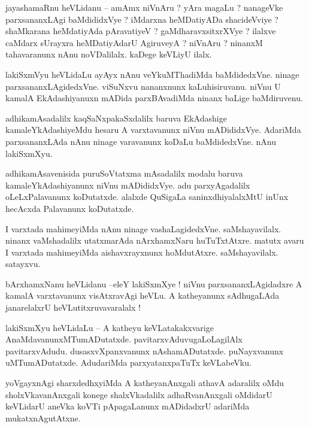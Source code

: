 \documentclass{article}
\begin{document}
\begin{mn}%
jayashamaRnu heVLidanu -- amAmx niVnAru ? yAra magaLu ? nanageVke parxsananxLAgi baMdididxVye ? 
iMdarxna heMDatiyADa shacideVviye ? shaMkarana heMdatiyAda pAravatiyeV ? gaMdharavxsitxrXVye ? 
ilalxve caMdarx sUrayxra heMDatiyAdarU AgiruveyA ? niVnAru ? ninanxM tahavaranunx nAnu 
noVDalilalx. kaDege keVLiyU ilalx.
\end{mn}

\begin{mn}%
lakiSxmVyu heVLidaLu ayAyx nAnu veYkuMThadiMda baMdidedxVne. ninage parxsananxLAgidedxVne. viSuNxvu 
nananxnunx kaLuhisiruvanu. niVnu U kamalA EkAdashiyanuxn mADida parxBAvadiMda ninanx baLige 
baMdiruvenu.
\end{mn}

\begin{mn}%
adhikamAsadalilx kaqSaNxpakaSxdalilx baruva EkAdashige kamaleYkAdashiyeMdu hesaru A varxtavanunx 
niVnu mADididxVye. AdariMda parxsananxLAda nAnu ninage varavanunx koDaLu baMdidedxVne. nAnu 
lakiSxmXyu.
\end{mn}

\begin{mn}%
adhikamAsavenisida puruSoVtatxma mAsadalilx modalu baruva kamaleYkAdashiyanunx niVnu mADididxVye. 
adu parxyAgadalilx oLeLxPalavanunx koDutatxde. alalxde QuSigaLa saninxdhiyalalxMtU inUnx hecAcxda 
Palavanunx koDutatxde.
\end{mn}

\begin{mn}%
I varxtada mahimeyiMda nAnu ninage vashaLagidedxVne. saMshayavilalx. ninanx vaMshadalilx 
utatxmarAda nArxhamxNaru huTuTxtAtxre. matutx avaru I varxtada mahimeyiMda aishavxrayxnunx 
hoMdutAtxre. saMshayavilalx. satayxvu.
\end{mn}

\begin{mn}%
bArxhamxNanu heVLidanu --eleY lakiSxmXye ! niVnu parxsananxLAgidadxre A kamalA varxtavanunx 
visAtxravAgi heVLu. A katheyanunx sAdhugaLAda janarelalxrU heVLutitxruvavaralalx !
\end{mn}

\begin{mn}%
lakiSxmXyu heVLidaLu -- A katheyu keVLatakakxvarige AnaMdavanunxMTumADutatxde. 
pavitarxvAduvugaLoLagilAlx pavitarxvAdudu. dusasxvXpanxvanunx nAshamADutatxde. puNayxvanunx 
uMTumADutatxde. AdudariMda parxyatanxpaTuTx keVLabeVku.
\end{mn}

\begin{mn}%
yoVgayxnAgi sharxdedhxyiMda A katheyanAnxgali athavA adaralilx oMdu sholxVkavanAnxgali konege 
shalxVkadalilx adhaRvanAnxgali oMdidarU keVLidarU aneVka koVTi pApagaLanunx mADidadxrU adariMda 
mukatxnAgutAtxne.
\end{mn}
\end{document}
